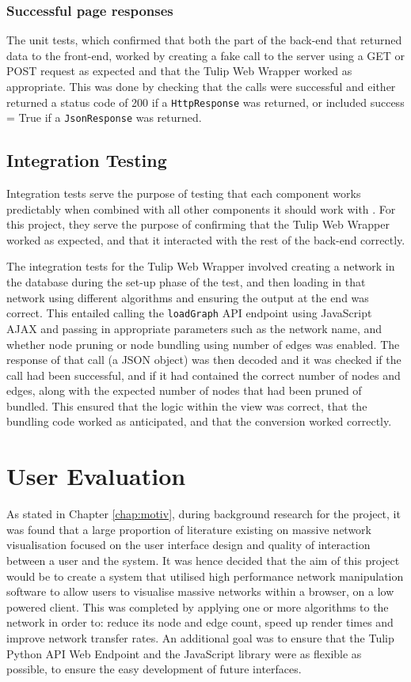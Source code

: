 \documentclass[../dissertation.tex]{subfiles}
\begin{document}
\subsubsection{Successful page responses}

The unit tests, which confirmed that both the part of the back-end that returned data to the front-end, worked by creating a fake call to the server using a GET or POST request as expected and that the Tulip Web Wrapper worked as appropriate. This was done by checking that the calls were successful and either returned a status code of 200 if a \texttt{HttpResponse} was returned, or included success = True if a \texttt{JsonResponse} was returned.

\subsection{Integration Testing}

Integration tests serve the purpose of testing that each component works predictably when combined with all other components it should work with \cite{basanieri2000practical}. For this project, they serve the purpose of confirming that the Tulip Web Wrapper worked as expected, and that it interacted with the rest of the back-end correctly.

The integration tests for the Tulip Web Wrapper involved creating a network in the database during the set-up phase of the test, and then loading in that network using different algorithms and ensuring the output at the end was correct. This entailed calling the \texttt{loadGraph} API endpoint using JavaScript AJAX \cite{jquery-ajax} and passing in appropriate parameters such as the network name, and whether node pruning or node bundling using number of edges was enabled. The response of that call (a JSON object) was then decoded and it was checked if the call had been successful, and if it had contained the correct number of nodes and edges, along with the expected number of nodes that had been pruned of bundled. This ensured that the logic within the view was correct, that the bundling code worked as anticipated, and that the conversion worked correctly.

\section{User Evaluation}

As stated in Chapter \ref{chap:motiv}, during background research for the project, it was found that a large proportion of literature existing on massive network visualisation focused on the user interface design and quality of interaction between a user and the system. It was hence decided that the aim of this project would be to create a system that utilised high performance network manipulation software to allow users to visualise massive networks within a browser, on a low powered client. This was completed by applying one or more algorithms to the network in order to: reduce its node and edge count, speed up render times and improve network transfer rates. An additional goal was to ensure that the Tulip Python API Web Endpoint and the JavaScript library were as flexible as possible, to ensure the easy development of future interfaces.
\end{document}
